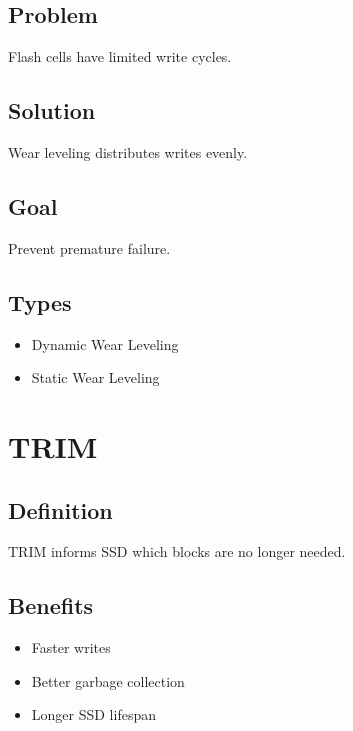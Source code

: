 \subsection{Problem}

Flash cells have limited write cycles.

\subsection{Solution}

Wear leveling distributes writes evenly.

\subsection{Goal}

Prevent premature failure.

\subsection{Types}

\begin{itemize}
\item Dynamic Wear Leveling
\item Static Wear Leveling
\end{itemize}

\section{TRIM}

\subsection{Definition}

TRIM informs SSD which blocks are no longer needed.

\subsection{Benefits}

\begin{itemize}
\item Faster writes
\item Better garbage collection
\item Longer SSD lifespan
\end{itemize}

